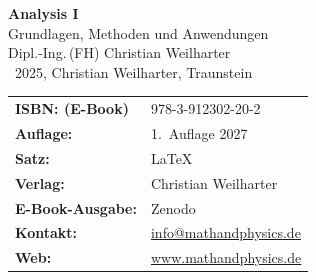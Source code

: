 \documentclass[a4paper,11pt]{report}
\begin{document}
\setcounter{secnumdepth}{3}
\setcounter{tocdepth}{3}
	

	
	\setcounter{secnumdepth}{3}
	\setcounter{tocdepth}{3}
	
	
	
	\clearpage
	\thispagestyle{empty}
	
	\vspace*{\fill}
	
\begin{center}
	
	{\fontsize{24}{29}\selectfont
		\textbf{Analysis I}}\\[0.8em]
	
	{\fontsize{16}{20}\selectfont
		Grundlagen, Methoden und Anwendungen}\\[2em]
	
	{\fontsize{14}{18}\selectfont
		Dipl.-Ing.\,(FH) Christian Weilharter}\\[2em]
	
	\textcopyright~2025, Christian Weilharter, Traunstein\\[2em]
		
		\begin{tabular}{@{}l l}
			
			
			\textbf{ISBN: (E-Book)} & 978-3-912302-20-2 \\[0.5em]
			\textbf{Auflage:} & 1.~Auflage 2027 \\[0.5em]
			\textbf{Satz:} & \LaTeX \\[0.5em]
			\textbf{Verlag:} & Christian Weilharter \\[0.5em]
			
			\textbf{E-Book-Ausgabe:} & Zenodo\\[0.5em]
			\textbf{Kontakt:} & \href{mailto:info@mathandphysics.de}{info@mathandphysics.de}\\[0.5em]
			\textbf{Web:} & \href{https://www.mathandphysics.de}{www.mathandphysics.de}\\
			
			
		\end{tabular}
		\end{center}
		
\end{document}
